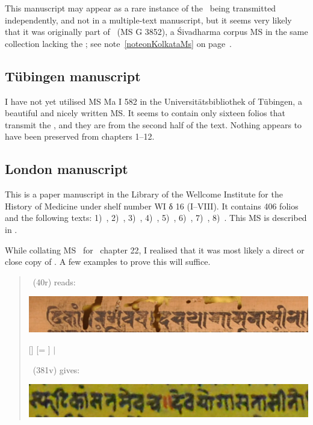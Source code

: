 This manuscript may appear as a rare instance of the \VSS\
being transmitted independently, and not in a multiple-text
manuscript, but it seems very likely that it was originally part of
\msKob\ (MS G 3852), a Śivadharma corpus MS  in the same collection 
lacking the \VSS; see note~\ref{noteonKolkataMs}
on page~\pageref{noteonKolkataMs}.


\medskip
\subsection{Tübingen manuscript}

I have not yet utilised MS Ma I 582 in the Universitätsbibliothek of
Tübingen, a beautiful and nicely written MS. 
It seems to contain only sixteen folios that transmit the \VSS, 
and they are from the second half of the text. 
Nothing appears to have been preserved from chapters 1--12.

\medskip
\subsection{London manuscript}

This is a paper manuscript in the
Library of the Wellcome Institute for the History of Medicine
under shelf number WI δ 16 (I--VIII). 
It contains 406 folios and the following texts: 
1)~\SDhS, 
2)~\SDhU,
3)~\SDhSangr, 
4)~\Ums,
5)~\SivaUp,
6)~\Uums,
7)~\Vss,
8)~\DharmP.
This MS is described in .

While collating MS \msL\ for \VSS\ chapter 22, 
I realised that it was most likely a 
direct or close copy of \msNa. 
A few examples to prove this will suffice.

\begin{quote}
\msNa\ (\fol40r) reads: 

\includegraphics[scale=.3]{images/dasayoga_msNa.png}

[]\lk {} [= ] 
 $|$ 

\msL\ (\fol381v) gives:

\includegraphics[scale=.3]{images/dasayoga_msL.png}

\end{quote}

